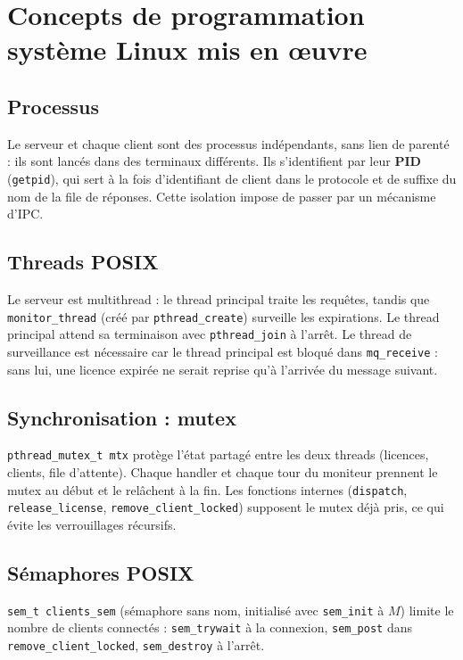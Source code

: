 \documentclass[11pt,a4paper]{article}
\newcommand{\code}[1]{\texttt{#1}}
\begin{document}
\section{Concepts de programmation système Linux mis en \oe uvre}

\subsection{Processus}

Le serveur et chaque client sont des processus indépendants, sans lien de parenté : ils sont lancés dans des terminaux différents. Ils s'identifient par leur \textbf{PID} (\code{getpid}), qui sert à la fois d'identifiant de client dans le protocole et de suffixe du nom de la file de réponses. Cette isolation impose de passer par un mécanisme d'IPC.

\subsection{Threads POSIX}

Le serveur est multithread : le thread principal traite les requêtes, tandis que \code{monitor\_thread} (créé par \code{pthread\_create}) surveille les expirations. Le thread principal attend sa terminaison avec \code{pthread\_join} à l'arrêt. Le thread de surveillance est nécessaire car le thread principal est bloqué dans \code{mq\_receive} : sans lui, une licence expirée ne serait reprise qu'à l'arrivée du message suivant.

\subsection{Synchronisation : mutex}

\code{pthread\_mutex\_t mtx} protège l'état partagé entre les deux threads (licences, clients, file d'attente). Chaque handler et chaque tour du moniteur prennent le mutex au début et le relâchent à la fin. Les fonctions internes (\code{dispatch}, \code{release\_license}, \code{remove\_client\_locked}) supposent le mutex déjà pris, ce qui évite les verrouillages récursifs.

\subsection{Sémaphores POSIX}

\code{sem\_t clients\_sem} (sémaphore sans nom, initialisé avec \code{sem\_init} à $M$) limite le nombre de clients connectés : \code{sem\_trywait} à la connexion, \code{sem\_post} dans \code{remove\_client\_locked}, \code{sem\_destroy} à l'arrêt.
\end{document}
